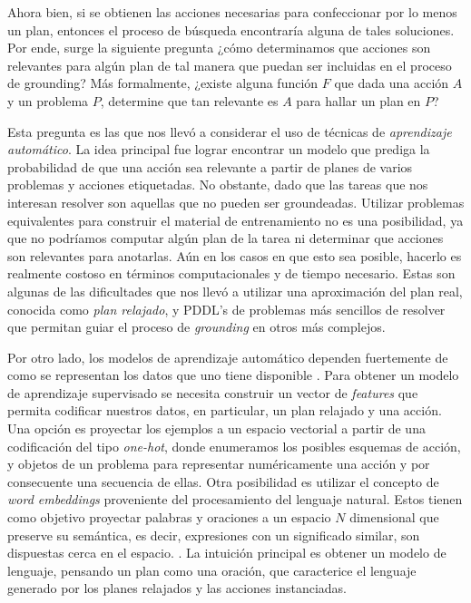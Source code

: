 Ahora bien, si se obtienen las acciones necesarias para confeccionar por lo
menos un plan, entonces el proceso de búsqueda encontraría alguna de tales
soluciones. Por ende, surge la siguiente pregunta ¿cómo determinamos que
acciones son relevantes para algún plan de tal manera que puedan ser incluidas
en el proceso de grounding? Más formalmente, ¿existe alguna función $F$
que dada una acción $A$ y un problema $P$, determine que tan relevante es $A$
para hallar un plan en $P$?

Esta pregunta es las que nos llevó a considerar el uso de técnicas de
\emph{aprendizaje automático}. La idea principal fue lograr encontrar un modelo
que prediga la probabilidad de que una acción sea relevante a partir de planes
de varios problemas y acciones etiquetadas. No obstante, dado que las tareas que
nos interesan resolver son aquellas que no pueden ser groundeadas. Utilizar
problemas equivalentes para construir el material de entrenamiento no es una
posibilidad, ya que no podríamos computar algún plan de la tarea ni determinar
que acciones son relevantes para anotarlas. Aún en los casos en que esto sea
posible, hacerlo es realmente costoso en términos computacionales y de tiempo
necesario. Estas son algunas de las dificultades que nos llevó a utilizar una
aproximación del plan real, conocida como \emph{plan relajado}, y PDDL's de
problemas más sencillos de resolver que permitan guiar el proceso de
\emph{grounding} en otros más complejos.

Por otro lado, los modelos de aprendizaje automático dependen fuertemente de
como se representan los datos que uno tiene disponible \citep{Heaton-2016-AnEA}.
Para obtener un modelo de aprendizaje supervisado se necesita construir un
vector de \emph{features} que permita codificar nuestros datos, en particular,
un plan relajado y una acción. Una opción es proyectar los ejemplos a un espacio
vectorial a partir de una codificación del tipo \emph{one-hot}, donde enumeramos
los posibles esquemas de acción, y objetos de un problema para representar
numéricamente una acción y por consecuente una secuencia de ellas. Otra
posibilidad es utilizar el concepto de \emph{word embeddings} proveniente del
procesamiento del lenguaje natural. Estos tienen como objetivo proyectar
palabras y oraciones a un espacio $N$ dimensional que preserve su semántica, es
decir, expresiones con un significado similar, son dispuestas cerca en el
espacio. \citep{Mikolov-Ilya-Kai-Greg-Jeffrey-2013,
Pennington-Jeffrey-Socher-Richard-Manning-Christopher-2014,
Bojanowski-Grave-Joulin-Mikolov-2016}. La intuición principal es obtener un
modelo de lenguaje, pensando un plan como una oración, que caracterice el
lenguaje generado por los planes relajados y las acciones instanciadas. 

